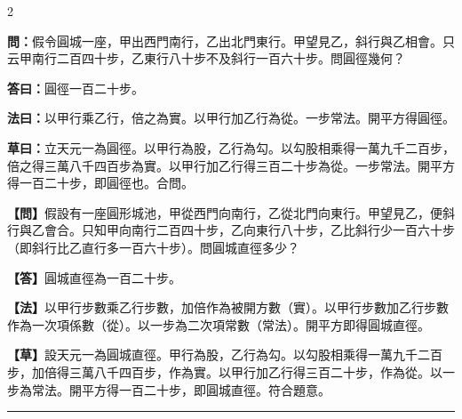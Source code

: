 \documentclass[11pt,a4paper]{article}
\newcommand{\longline}{\noindent\rule{\textwidth}{0.4pt}}
\newcommand{\wenC}[1]{\par\noindent\textbf{\textcolor{probcolor}{問：}}{#1}\par}
\newcommand{\daC}[1]{\par\noindent\textbf{\textcolor{anscolor}{答曰：}}{#1}\par}
\newcommand{\fayueC}[1]{\par\noindent\textbf{\textcolor{methodcolor}{法曰：}}{#1}\par}
\newcommand{\caoyueC}[1]{\par\noindent\textbf{草曰：}{#1}\par}
\newcommand{\wenM}[1]{\par\noindent\textbf{\textcolor{probcolor}{【問】}}{#1}\par}
\newcommand{\daM}[1]{\par\noindent\textbf{\textcolor{anscolor}{【答】}}{#1}\par}
\newcommand{\fayueM}[1]{\par\noindent\textbf{\textcolor{methodcolor}{【法】}}{#1}\par}
\newcommand{\caoyueM}[1]{\par\noindent\textbf{【草】}{#1}\par}
\begin{document}
\begin{paracol}{2}

\wenC{假令圓城一座，甲出西門南行，乙出北門東行。甲望見乙，斜行與乙相會。只云甲南行二百四十步，乙東行八十步不及斜行一百六十步。問圓徑幾何？}

\daC{圓徑一百二十步。}

\fayueC{以甲行乘乙行，倍之為實。以甲行加乙行為從。一步常法。開平方得圓徑。}

\caoyueC{立天元一為圓徑。以甲行為股，乙行為勾。以勾股相乘得一萬九千二百步，倍之得三萬八千四百步為實。以甲行加乙行得三百二十步為從。一步常法。開平方得一百二十步，即圓徑也。合問。}

\switchcolumn

\wenM{假設有一座圓形城池，甲從西門向南行，乙從北門向東行。甲望見乙，便斜行與乙會合。只知甲向南行二百四十步，乙向東行八十步，乙比斜行少一百六十步（即斜行比乙直行多一百六十步）。問圓城直徑多少？}

\daM{圓城直徑為一百二十步。}

\fayueM{以甲行步數乘乙行步數，加倍作為被開方數（實）。以甲行步數加乙行步數作為一次項係數（從）。以一步為二次項常數（常法）。開平方即得圓城直徑。}

\caoyueM{設天元一為圓城直徑。甲行為股，乙行為勾。以勾股相乘得一萬九千二百步，加倍得三萬八千四百步，作為實。以甲行加乙行得三百二十步，作為從。以一步為常法。開平方得一百二十步，即圓城直徑。符合題意。}

\end{paracol}

\vspace{0.3cm}
\longline
\end{document}

